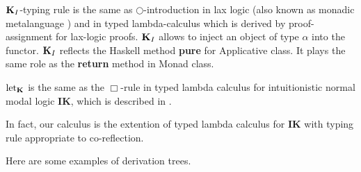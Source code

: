 \documentclass[a4paper]{article}
\begin{document}
  ${\bf K}_I$-typing rule is the same as $\bigcirc$-introduction in lax logic (also known as monadic
  metalanguage \cite{Lax}) and in typed lambda-calculus which is derived by proof-assignment for lax-logic
  proofs.
  ${\bf K}_I$ allows to inject an object of type $\alpha$ into the functor. ${\bf K}_I$  reflects the
  Haskell method {\bf pure} for Applicative class. It plays the same role as the {\bf return} method in Monad class.

  $\text{let}_{{\bf K}}$ is the same as the $\Box$-rule in typed lambda calculus for intuitionistic normal modal logic {\bf IK}, which is described in \cite{ModalK}.

  In fact, our calculus is the extention of typed lambda calculus for {\bf IK} with typing rule appropriate to co-reflection.

  \vspace{\baselineskip}

Here are some examples of derivation trees.

  \begin{prooftree}
  \end{prooftree}


  \begin{prooftree}
  \end{prooftree}

\begin{prooftree}
\end{prooftree}
\end{document}
